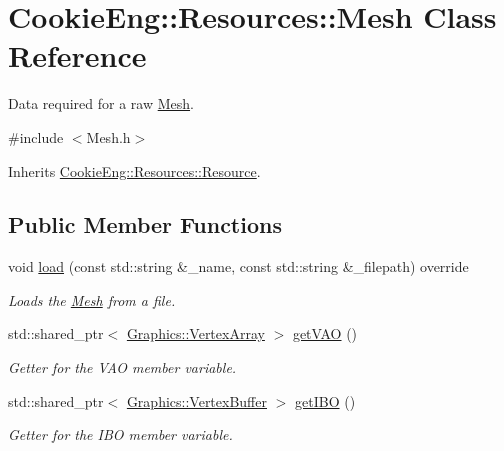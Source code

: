 \hypertarget{struct_cookie_eng_1_1_resources_1_1_mesh}{}\section{Cookie\+Eng\+:\+:Resources\+:\+:Mesh Class Reference}
\label{struct_cookie_eng_1_1_resources_1_1_mesh}


Data required for a raw \hyperlink{struct_cookie_eng_1_1_resources_1_1_mesh}{Mesh}.  




{\ttfamily \#include $<$Mesh.\+h$>$}



Inherits \hyperlink{class_cookie_eng_1_1_resources_1_1_resource}{Cookie\+Eng\+::\+Resources\+::\+Resource}.

\subsection*{Public Member Functions}
\begin{DoxyCompactItemize}
\item 
void \hyperlink{struct_cookie_eng_1_1_resources_1_1_mesh_ae31053c6edaf0e735d85350bfa6093fb}{load} (const std\+::string \&\+\_\+name, const std\+::string \&\+\_\+filepath) override
\begin{DoxyCompactList}\small\item\em Loads the \hyperlink{struct_cookie_eng_1_1_resources_1_1_mesh}{Mesh} from a file. \end{DoxyCompactList}\item 
std\+::shared\+\_\+ptr$<$ \hyperlink{class_cookie_eng_1_1_graphics_1_1_vertex_array}{Graphics\+::\+Vertex\+Array} $>$ \hyperlink{struct_cookie_eng_1_1_resources_1_1_mesh_ab61a5cfe63393488dfb17a905e7721d6}{get\+V\+AO} ()
\begin{DoxyCompactList}\small\item\em Getter for the V\+AO member variable. \end{DoxyCompactList}\item 
std\+::shared\+\_\+ptr$<$ \hyperlink{class_cookie_eng_1_1_graphics_1_1_vertex_buffer}{Graphics\+::\+Vertex\+Buffer} $>$ \hyperlink{struct_cookie_eng_1_1_resources_1_1_mesh_a322630a222821c217f45b38c25fafc3a}{get\+I\+BO} ()
\begin{DoxyCompactList}\small\item\em Getter for the I\+BO member variable. \end{DoxyCompactList}\end{DoxyCompactItemize}
